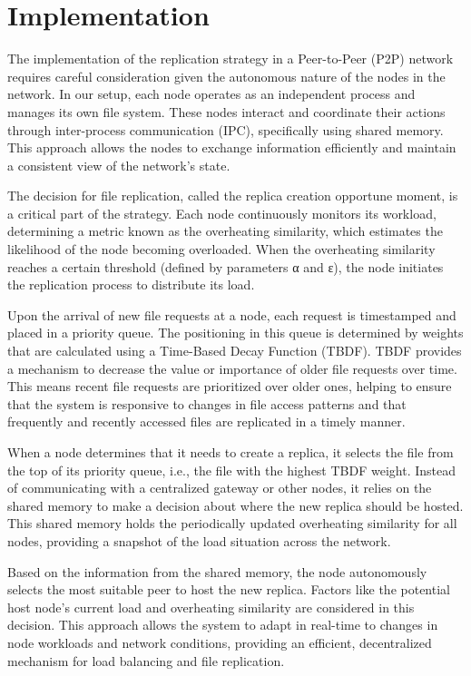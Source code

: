 \documentclass[10pt, conference]{IEEEtran}
\begin{document}
\section{Implementation}\label{sec:implementation}
The implementation of the replication strategy in a Peer-to-Peer (P2P) network requires careful consideration given the autonomous nature of the nodes in the network. In our setup, each node operates as an independent process and manages its own file system. These nodes interact and coordinate their actions through inter-process communication (IPC), specifically using shared memory. This approach allows the nodes to exchange information efficiently and maintain a consistent view of the network's state.

The decision for file replication, called the replica creation opportune moment, is a critical part of the strategy. Each node continuously monitors its workload, determining a metric known as the overheating similarity, which estimates the likelihood of the node becoming overloaded. When the overheating similarity reaches a certain threshold (defined by parameters α and ε), the node initiates the replication process to distribute its load.

Upon the arrival of new file requests at a node, each request is timestamped and placed in a priority queue. The positioning in this queue is determined by weights that are calculated using a Time-Based Decay Function (TBDF). TBDF provides a mechanism to decrease the value or importance of older file requests over time. This means recent file requests are prioritized over older ones, helping to ensure that the system is responsive to changes in file access patterns and that frequently and recently accessed files are replicated in a timely manner.

When a node determines that it needs to create a replica, it selects the file from the top of its priority queue, i.e., the file with the highest TBDF weight. Instead of communicating with a centralized gateway or other nodes, it relies on the shared memory to make a decision about where the new replica should be hosted. This shared memory holds the periodically updated overheating similarity for all nodes, providing a snapshot of the load situation across the network.

Based on the information from the shared memory, the node autonomously selects the most suitable peer to host the new replica. Factors like the potential host node's current load and overheating similarity are considered in this decision. This approach allows the system to adapt in real-time to changes in node workloads and network conditions, providing an efficient, decentralized mechanism for load balancing and file replication.
\end{document}
